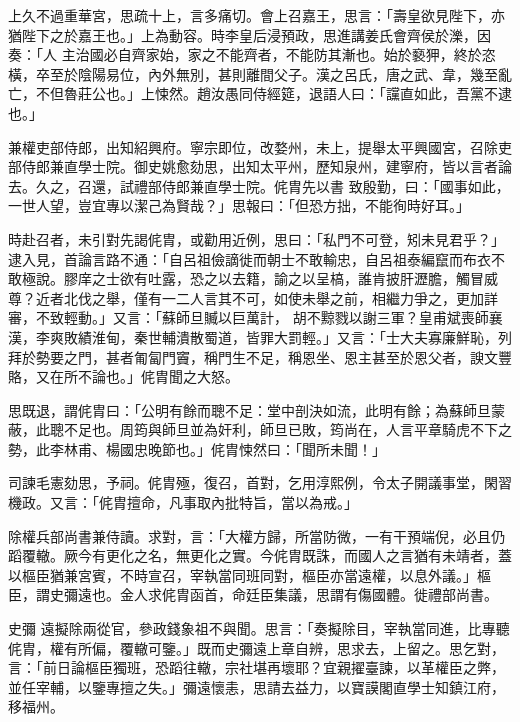\begin{pinyinscope}
 上久不過重華宮，思疏十上，言多痛切。會上召嘉王，思言：「壽皇欲見陛下，亦猶陛下之於嘉王也。」上為動容。時李皇后浸預政，思進講姜氏會齊侯於濼，因奏：「人
 主治國必自齊家始，家之不能齊者，不能防其漸也。始於褻狎，終於恣橫，卒至於陰陽易位，內外無別，甚則離間父子。漢之呂氏，唐之武、韋，幾至亂亡，不但魯莊公也。」上悚然。趙汝愚同侍經筵，退語人曰：「讜直如此，吾黨不逮也。」



 兼權吏部侍郎，出知紹興府。寧宗即位，改婺州，未上，提舉太平興國宮，召除吏部侍郎兼直學士院。御史姚愈劾思，出知太平州，歷知泉州，建寧府，皆以言者論去。久之，召還，試禮部侍郎兼直學士院。侂胄先以書
 致殷勤，曰：「國事如此，一世人望，豈宜專以潔己為賢哉？」思報曰：「但恐方拙，不能徇時好耳。」



 時赴召者，未引對先謁侂胄，或勸用近例，思曰：「私門不可登，矧未見君乎？」逮入見，首論言路不通：「自呂祖儉謫徙而朝士不敢輸忠，自呂祖泰編竄而布衣不敢極說。膠庠之士欲有吐露，恐之以去籍，諭之以呈槁，誰肯披肝瀝膽，觸冒威尊？近者北伐之舉，僅有一二人言其不可，如使未舉之前，相繼力爭之，更加詳審，不致輕動。」又言：「蘇師旦贓以巨萬計，
 胡不黥戮以謝三軍？皇甫斌喪師襄漢，李爽敗績淮甸，秦世輔潰散蜀道，皆罪大罰輕。」又言：「士大夫寡廉鮮恥，列拜於勢要之門，甚者匍匐門竇，稱門生不足，稱恩坐、恩主甚至於恩父者，諛文豐賂，又在所不論也。」侂胄聞之大怒。



 思既退，謂侂胄曰：「公明有餘而聰不足：堂中剖決如流，此明有餘；為蘇師旦蒙蔽，此聰不足也。周筠與師旦並為奸利，師旦已敗，筠尚在，人言平章騎虎不下之勢，此李林甫、楊國忠晚節也。」侂胄悚然曰：「聞所未聞！」



 司諫毛憲劾思，予祠。侂胄殛，復召，首對，乞用淳熙例，令太子開議事堂，閑習機政。又言：「侂胄擅命，凡事取內批特旨，當以為戒。」



 除權兵部尚書兼侍讀。求對，言：「大權方歸，所當防微，一有干預端倪，必且仍蹈覆轍。厥今有更化之名，無更化之實。今侂胄既誅，而國人之言猶有未靖者，蓋以樞臣猶兼宮賓，不時宣召，宰執當同班同對，樞臣亦當遠權，以息外議。」樞臣，謂史彌遠也。金人求侂胄函首，命廷臣集議，思謂有傷國體。徙禮部尚書。



 史彌
 遠擬除兩從官，參政錢象祖不與聞。思言：「奏擬除目，宰執當同進，比專聽侂胄，權有所偏，覆轍可鑒。」既而史彌遠上章自辨，思求去，上留之。思乞對，言：「前日論樞臣獨班，恐蹈往轍，宗社堪再壞耶？宜親擢臺諫，以革權臣之弊，並任宰輔，以鑒專擅之失。」彌遠懷恚，思請去益力，以寶謨閣直學士知鎮江府，移福州。




\end{pinyinscope}
